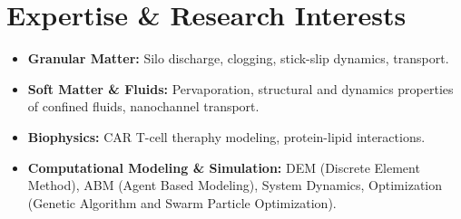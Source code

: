 \section*{Expertise \& Research Interests}
\begin{itemize}
	\item \textbf{Granular Matter:} Silo discharge, clogging, stick-slip dynamics, transport.
	\item \textbf{Soft Matter \& Fluids:} Pervaporation, structural and dynamics properties of confined fluids, nanochannel transport.
	\item \textbf{Biophysics:} CAR T-cell theraphy modeling, protein-lipid interactions.
	\item \textbf{Computational Modeling \& Simulation:} DEM (Discrete Element Method), ABM (Agent Based Modeling), System Dynamics, Optimization (Genetic Algorithm and Swarm Particle Optimization).
\end{itemize}
